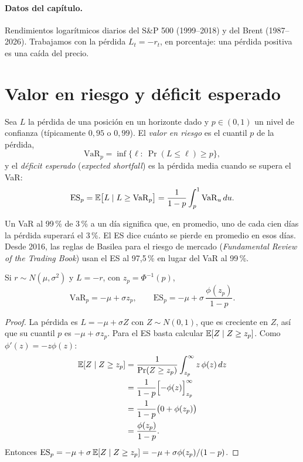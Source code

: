 \paragraph{Datos del capítulo.} Rendimientos logarítmicos diarios del S\&P 500 (1999--2018) y del Brent
(1987--2026). Trabajamos con la pérdida $L_t=-r_t$, en porcentaje: una pérdida positiva es una caída del precio.

\section{Valor en riesgo y déficit esperado}

\begin{definicion}[VaR y ES]
Sea $L$ la pérdida de una posición en un horizonte dado y $p\in(0,1)$ un nivel de confianza (típicamente
$0{,}95$ o $0{,}99$). El \emph{valor en riesgo} es el cuantil $p$ de la pérdida,
\[
  \mathrm{VaR}_p=\inf\{\ell:\ \Pr(L\le\ell)\ge p\},
\]
y el \emph{déficit esperado} (\emph{expected shortfall}) es la pérdida media cuando se supera el VaR:
\[
  \mathrm{ES}_p=\mathbb{E}\bigl[L\mid L\ge\mathrm{VaR}_p\bigr]=\frac{1}{1-p}\int_p^1\mathrm{VaR}_u\,du .
\]
\end{definicion}

Un VaR al 99\,\% de 3\,\% a un día significa que, en promedio, uno de cada cien días la pérdida superará el 3\,\%. El
ES dice cuánto se pierde en promedio en esos días. Desde 2016, las reglas de Basilea para el riesgo de mercado
(\emph{Fundamental Review of the Trading Book}) usan el ES al 97,5\,\% en lugar del VaR al 99\,\%.

\begin{proposicion}\label{prop:esnormal}
Si $r\sim N(\mu,\sigma^2)$ y $L=-r$, con $z_p=\Phi^{-1}(p)$,
\[
  \mathrm{VaR}_p=-\mu+\sigma z_p,\qquad \mathrm{ES}_p=-\mu+\sigma\,\frac{\phi(z_p)}{1-p}.
\]
\end{proposicion}

\begin{proof}
La pérdida es $L=-\mu+\sigma Z$ con $Z\sim N(0,1)$, que es creciente en $Z$, así que su cuantil $p$ es
$-\mu+\sigma z_p$. Para el ES basta calcular $\mathbb{E}[Z\mid Z\ge z_p]$. Como $\phi'(z)=-z\phi(z)$:
\begin{align*}
  \mathbb{E}[Z\mid Z\ge z_p] &= \frac{1}{\Pr(Z\ge z_p)}\int_{z_p}^{\infty}z\,\phi(z)\,dz\\
                     &= \frac{1}{1-p}\Bigl[-\phi(z)\Bigr]_{z_p}^{\infty}\\
                     &= \frac{1}{1-p}\bigl(0+\phi(z_p)\bigr)\\
                     &= \frac{\phi(z_p)}{1-p}.
\end{align*}
Entonces $\mathrm{ES}_p=-\mu+\sigma\,\mathbb{E}[Z\mid Z\ge z_p]=-\mu+\sigma\phi(z_p)/(1-p)$.
\end{proof}

